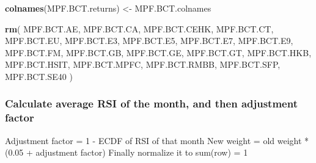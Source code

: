 \documentclass[
]{article}
\newenvironment{Shaded}{\begin{snugshade}}{\end{snugshade}}
\newcommand{\KeywordTok}[1]{\textcolor[rgb]{0.13,0.29,0.53}{\textbf{#1}}}
\newcommand{\NormalTok}[1]{#1}
\newcommand{\StringTok}[1]{\textcolor[rgb]{0.31,0.60,0.02}{#1}}
\begin{document}
\begin{Shaded}
\begin{Highlighting}[]
\KeywordTok{colnames}\NormalTok{(MPF.BCT.returns) <-}\StringTok{ }\NormalTok{MPF.BCT.colnames}
  
\KeywordTok{rm}\NormalTok{(}
\NormalTok{  MPF.BCT.AE,}
\NormalTok{  MPF.BCT.CA,}
\NormalTok{  MPF.BCT.CEHK,}
\NormalTok{  MPF.BCT.CT,}
\NormalTok{  MPF.BCT.EU,}
\NormalTok{  MPF.BCT.E3,}
\NormalTok{  MPF.BCT.E5,}
\NormalTok{  MPF.BCT.E7,}
\NormalTok{  MPF.BCT.E9,}
\NormalTok{  MPF.BCT.FM,}
\NormalTok{  MPF.BCT.GB,}
\NormalTok{  MPF.BCT.GE,}
\NormalTok{  MPF.BCT.GT,}
\NormalTok{  MPF.BCT.HKB,}
\NormalTok{  MPF.BCT.HSIT,}
\NormalTok{  MPF.BCT.MPFC,}
\NormalTok{  MPF.BCT.RMBB,}
\NormalTok{  MPF.BCT.SFP,}
\NormalTok{  MPF.BCT.SE40}
\NormalTok{)}
\end{Highlighting}
\end{Shaded}

\hypertarget{calculate-average-rsi-of-the-month-and-then-adjustment-factor}{%
\subsubsection{Calculate average RSI of the month, and then adjustment
factor}\label{calculate-average-rsi-of-the-month-and-then-adjustment-factor}}

Adjustment factor = 1 - ECDF of RSI of that month New weight = old
weight * (0.05 + adjustment factor) Finally normalize it to sum(row) = 1
\end{document}
